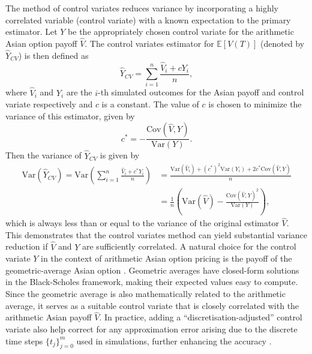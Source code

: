 The method of control variates reduces variance by incorporating a highly correlated variable (control variate) with a known expectation to the primary estimator. Let $Y$ be the appropriately chosen control variate for the arithmetic Asian option payoff \(\widehat{V}\).
The control variates estimator for \( \mathbb{E}[V(T)] \) (denoted by $\widehat{Y}_{CV}$) is then defined as
\[
\widehat{Y}_{CV} = \sum_{i=1}^n \frac{\widehat{V}_i + c Y_i}{n},
\]
where \(\widehat{V}_i\) and \(Y_i\) are the \(i\)-th simulated outcomes for the Asian payoff and control variate respectively and \(c\) is a constant. The value of \(c\) is chosen to minimize the variance of this estimator, given by \cite{nummethods}
\[
c^* = -\frac{\text{Cov}(\widehat{V}, Y)}{\text{Var}(Y)}.
\]
Then the variance of $\widehat{Y}_{CV}$ is given by
\begin{align*}
    \text{Var} \left(\widehat{Y}_{CV} \right) = \text{Var} \left( \sum_{i=1}^n \frac{\widehat{V}_i + c^* Y_i}{n} \right) & = \frac{\text{Var} \left( \widehat{V}_i \right) + (c^*)^2 \text{Var} \left( Y_i \right) + 2c^* \text{Cov}(\widehat{V}, Y)}{n} \\
    & = \frac{1}{n} \left( \text{Var}(\widehat{V}) - \frac{\text{Cov}(\widehat{V}, Y)^2}{\text{Var}(Y)} \right),
\end{align*}
which is always less than or equal to the variance of the original estimator \( \widehat{V} \). This demonstrates that the control variates method can yield substantial variance reduction if \( \widehat{V}\) and \(Y\) are sufficiently correlated.
A natural choice for the control variate \(Y\) in the context of arithmetic Asian option pricing is the payoff of the geometric-average Asian option \cite{kemna}. 
Geometric averages have closed-form solutions in the Black-Scholes framework, making their expected values easy to compute. Since the geometric average is also mathematically related to the arithmetic average, it serves as a suitable control variate that is closely correlated with the arithmetic Asian payoff \( \widehat{V}\). In practice, adding a “discretisation-adjusted” control variate also help correct for any approximation error arising due to the discrete time steps \( \{t_j\}_{j=0}^{m} \) used in simulations, further enhancing the accuracy \cite{nummethods}.